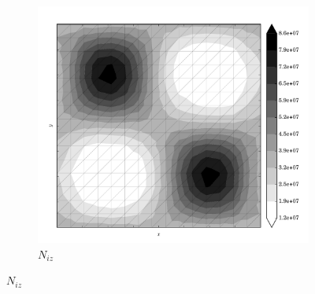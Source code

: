 \begin{figure}
  \begin{subfigure}[b]{0.3\linewidth}
    \includegraphics[width=\linewidth]{images/stress_balance/FS/N_iz.pdf}
  \caption{$N_{iz}$}
  \label{fs_N_iz}
  \end{subfigure}


\end{figure}
